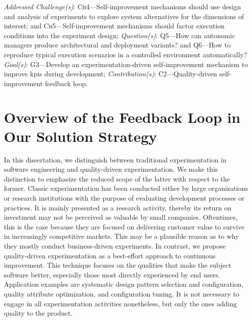 \begin{InfoBox}
	\emph{Addressed Challenge(s)}: \textsc{Ch}4---Self-improvement mechanisms should use design and analysis of experiments to explore system alternatives for the dimensions of interest; and \textsc{Ch}5---Self-improvement mechanisms should factor execution conditions into the experiment design; 
	\emph{Question(s)}: \textsc{Q}5---How can autonomic managers produce architectural and deployment variants? and \textsc{Q}6---How to reproduce typical execution scenarios in a controlled environment automatically? 
	\emph{Goal(s)}: \textsc{G}3---Develop an experimentation-driven self-improvement mechanism to improve \glspl{kpi} during development; 
	\emph{Contribution(s)}: \textsc{C}2---Quality-driven self-improvement feedback loop.
\end{InfoBox}

\section{Overview of the Feedback Loop in Our Solution Strategy}
\label{sect:architectural-framework--overview}

In this dissertation, we distinguish between traditional experimentation in software engineering and quality-driven experimentation. We make this distinction to emphasize the reduced scope of the latter with respect to the former. Classic experimentation has been conducted either by large organizations or research institutions with the purpose of evaluating development processes or practices. It is mainly presented as a research activity, thereby its return on investment may not be perceived as valuable by small companies. Oftentimes, this is the case because they are focused on delivering customer value to survive in increasingly competitive markets. This may be a plausible reason as to why they mostly conduct business-driven experiments. In contrast, we propose quality-driven experimentation as a best-effort approach to continuous improvement. This technique focuses on the qualities that make the subject software better, especially those most directly experienced by end users. Application examples are systematic design pattern selection and configuration, quality attribute optimization, and configuration tuning. It is not necessary to engage in all experimentation activities nonetheless, but only the ones adding quality to the product.

